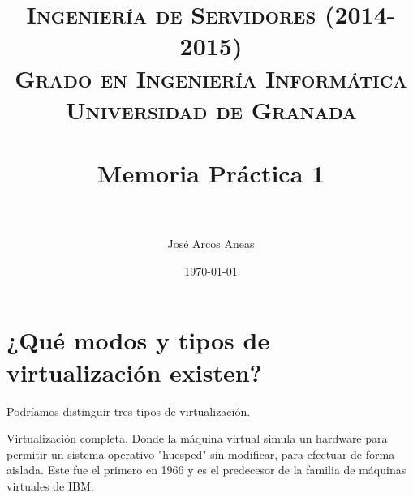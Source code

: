 


\title{	
\normalfont \normalsize 
\textsc{{\bf Ingeniería de Servidores (2014-2015)} \\ Grado en Ingeniería Informática \\ Universidad de Granada} \\ [25pt] %
\horrule{0.5pt} \\[0.4cm] %
\huge Memoria Práctica 1 \\ %
\horrule{2pt} \\[0.5cm] %
}

\author{José Arcos Aneas} %

\date{\normalsize\today} %




\maketitle %

\newpage %

\tableofcontents %

\listoffigures


\newpage

\section{¿Qué modos y tipos de virtualización existen?}

Podríamos distinguir tres tipos de virtualización.

Virtualización completa.
	Donde la máquina virtual simula un hardware para permitir un sistema operativo "huesped" sin modificar, para efectuar de forma aislada. Este fue el primero en 1966  y es el predecesor de la familia de máquinas virtuales de IBM.
	
